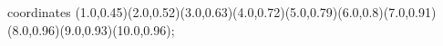 					coordinates { (1.0,0.45)(2.0,0.52)(3.0,0.63)(4.0,0.72)(5.0,0.79)(6.0,0.8)(7.0,0.91)(8.0,0.96)(9.0,0.93)(10.0,0.96)};